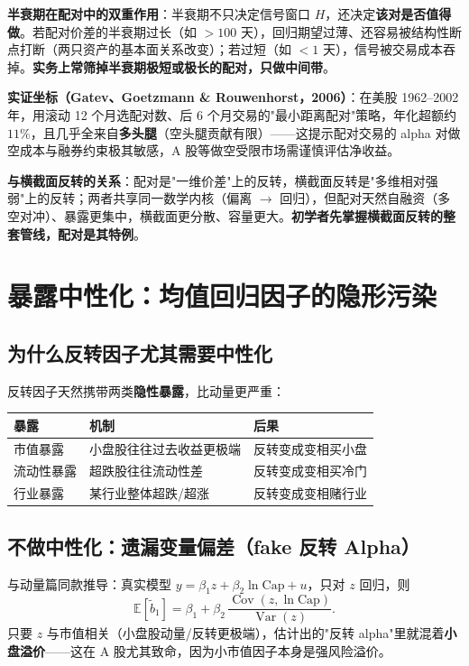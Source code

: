 \documentclass[UTF8,11pt]{ctexart}
\begin{document}
\textbf{半衰期在配对中的双重作用}：半衰期不只决定信号窗口 $H$，还决定\textbf{该对是否值得做}。若配对价差的半衰期过长（如 $>100$ 天），回归期望过薄、还容易被结构性断点打断（两只资产的基本面关系改变）；若过短（如 $<1$ 天），信号被交易成本吞掉。\textbf{实务上常筛掉半衰期极短或极长的配对，只做中间带}。

\textbf{实证坐标（Gatev、Goetzmann \& Rouwenhorst，2006）}：在美股 1962--2002 年，用滚动 12 个月选配对数、后 6 个月交易的"最小距离配对"策略，年化超额约 $11\%$，且几乎全来自\textbf{多头腿}（空头腿贡献有限）——这提示配对交易的 alpha 对做空成本与融券约束极其敏感，A 股等做空受限市场需谨慎评估净收益。

\textbf{与横截面反转的关系}：配对是"一维价差"上的反转，横截面反转是"多维相对强弱"上的反转；两者共享同一数学内核（偏离 $\to$ 回归），但配对天然自融资（多空对冲）、暴露更集中，横截面更分散、容量更大。\textbf{初学者先掌握横截面反转的整套管线，配对是其特例}。

\section{暴露中性化：均值回归因子的隐形污染}

\subsection{为什么反转因子尤其需要中性化}
反转因子天然携带两类\textbf{隐性暴露}，比动量更严重：
\begin{center}
\renewcommand{\arraystretch}{1.4}
\begin{tabular}{@{}lll@{}}
\toprule
暴露 & 机制 & 后果 \\
\midrule
市值暴露 & 小盘股往往过去收益更极端 & 反转变成变相买小盘 \\
流动性暴露 & 超跌股往往流动性差 & 反转变成变相买冷门 \\
行业暴露 & 某行业整体超跌/超涨 & 反转变成变相赌行业 \\
\bottomrule
\end{tabular}
\end{center}

\subsection{不做中性化：遗漏变量偏差（fake 反转 Alpha）}
与动量篇同款推导：真实模型 $y=\beta_1 z+\beta_2 \ln\text{Cap}+u$，只对 $z$ 回归，则
\begin{equation}
\mathbb{E}[\tilde b_1] = \beta_1 + \beta_2\,\frac{\operatorname{Cov}(z,\ln\text{Cap})}{\operatorname{Var}(z)}.
\end{equation}
只要 $z$ 与市值相关（小盘股动量/反转更极端），估计出的"反转 alpha"里就混着\textbf{小盘溢价}——这在 A 股尤其致命，因为小市值因子本身是强风险溢价。
\end{document}
